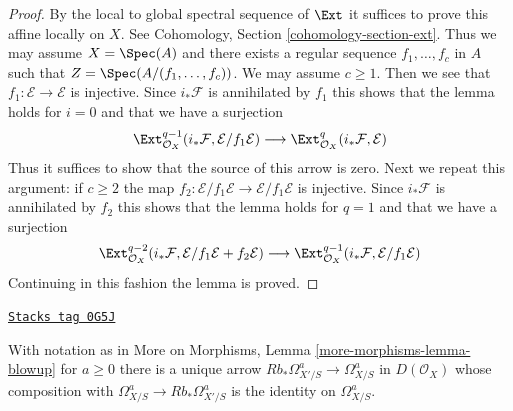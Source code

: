 \begin{proof}
By the local to global spectral sequence of $\Ext$ it suffices
to prove this affine locally on $X$. See
Cohomology, Section \ref{cohomology-section-ext}.
Thus we may assume $X = \Spec(A)$
and there exists a regular sequence $f_1, \ldots, f_c$ in $A$
such that $Z = \Spec(A/(f_1, \ldots, f_c))$. We may assume $c \geq 1$.
Then we see that $f_1 : \mathcal{E} \to \mathcal{E}$
is injective. Since $i_*\mathcal{F}$ is annihilated by $f_1$
this shows that the lemma holds for $i = 0$ and that we have
a surjection
$$
\Ext^{q - 1}_{\mathcal{O}_X}(i_*\mathcal{F}, \mathcal{E}/f_1\mathcal{E})
\longrightarrow
\Ext^q_{\mathcal{O}_X}(i_*\mathcal{F}, \mathcal{E})
$$
Thus it suffices to show that the source of this arrow is zero.
Next we repeat this argument: if $c \geq 2$ the map
$f_2 : \mathcal{E}/f_1\mathcal{E} \to \mathcal{E}/f_1\mathcal{E}$
is injective. Since $i_*\mathcal{F}$ is annihilated by $f_2$
this shows that the lemma holds for $q = 1$ and that we have a
surjection
$$
\Ext^{q - 2}_{\mathcal{O}_X}(i_*\mathcal{F},
\mathcal{E}/f_1\mathcal{E} + f_2\mathcal{E})
\longrightarrow
\Ext^{q - 1}_{\mathcal{O}_X}(i_*\mathcal{F}, \mathcal{E}/f_1\mathcal{E})
$$
Continuing in this fashion the lemma is proved.
\end{proof}

\begin{lemma}
\label{derham-lemma-splitting-on-omega-a}
\href{https://stacks.math.columbia.edu/tag/0G5J}{\texttt{Stacks tag 0G5J}}

With notation as in More on Morphisms, Lemma \ref{more-morphisms-lemma-blowup}
for $a \geq 0$ there is a unique arrow
$Rb_*\Omega^a_{X'/S} \to \Omega^a_{X/S}$ in $D(\mathcal{O}_X)$
whose composition with $\Omega^a_{X/S} \to Rb_*\Omega^a_{X'/S}$
is the identity on $\Omega^a_{X/S}$.
\end{lemma}

